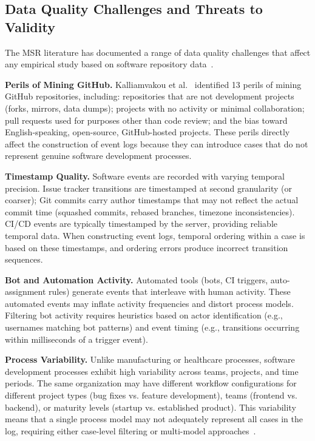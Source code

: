 \subsection{Data Quality Challenges and Threats to Validity}
\label{sec:msr-quality}

The MSR literature has documented a range of data quality challenges that
affect any empirical study based on software repository
data~\cite{kochhar2019moving}.

\textbf{Perils of Mining GitHub.} Kalliamvakou et
al.~\cite{kochhar2019moving} identified 13 perils of mining GitHub
repositories, including: repositories that are not development projects
(forks, mirrors, data dumps); projects with no activity or minimal
collaboration; pull requests used for purposes other than code review;
and the bias toward English-speaking, open-source, GitHub-hosted projects.
These perils directly affect the construction of event logs because they
can introduce cases that do not represent genuine software development
processes.

\textbf{Timestamp Quality.} Software events are recorded with varying
temporal precision. Issue tracker transitions are timestamped at second
granularity (or coarser); Git commits carry author timestamps that may
not reflect the actual commit time (squashed commits, rebased branches,
timezone inconsistencies). CI/CD events are typically timestamped by the
server, providing reliable temporal data. When constructing event logs,
temporal ordering within a case is based on these timestamps, and
ordering errors produce incorrect transition sequences.

\textbf{Bot and Automation Activity.} Automated tools (bots, CI triggers,
auto-assignment rules) generate events that interleave with human
activity. These automated events may inflate activity frequencies and
distort process models. Filtering bot activity requires heuristics based
on actor identification (e.g., usernames matching bot patterns) and
event timing (e.g., transitions occurring within milliseconds of a
trigger event).

\textbf{Process Variability.} Unlike manufacturing or healthcare
processes, software development processes exhibit high variability across
teams, projects, and time periods. The same organization may have
different workflow configurations for different project types (bug fixes
vs. feature development), teams (frontend vs. backend), or maturity
levels (startup vs. established product). This variability means that a
single process model may not adequately represent all cases in the log,
requiring either case-level filtering or multi-model
approaches~\cite{dambros2012evaluating}.

